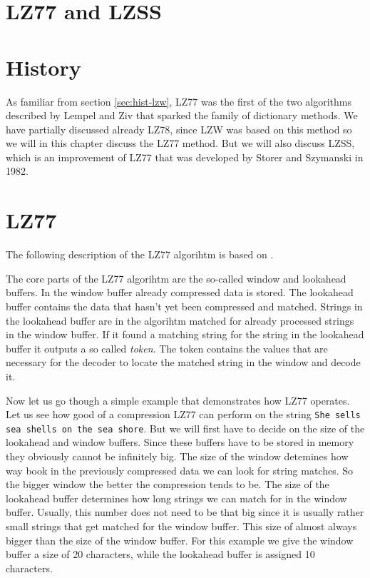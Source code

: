 \begin{comment}
  
\end{comment}

\section{LZ77 and LZSS}
\label{sec:lz77-lzss}

\section{History}

As familiar from section \ref{sec:hist-lzw}, LZ77 was the first of the
two algorithms described by Lempel and Ziv that sparked the family of
dictionary methods. We have partially discussed already LZ78, since
LZW was based on this method so we will in this chapter discuss the
LZ77 method. But we will also discuss LZSS, which is an improvement of
LZ77 that was developed by Storer and Szymanski in 1982.

\section{LZ77}

The following description of the LZ77 algorihtm is based on
\cite{Salomon:2004:DCC,mark1996data_compression_book,mcfadden92:_hackin_data_compr_ziv_lempel}.


The core parts of the LZ77 algorihtm are the so-called window and
lookahead buffers. In the window buffer already compressed data is
stored. The lookahead buffer contains the data that hasn't yet been
compressed and matched. Strings in the lookahead buffer are in the
algorihtm matched for already processed strings in the window
buffer. If it found a matching string for the string in the lookahead
buffer it outputs a so called \textit{token}. The token contains the
values that are necessary for the decoder to locate the matched
string in the window and decode it.

Now let us go though a simple example that demonstrates how LZ77
operates. Let us see how good of a compression LZ77 can perform on the
string \texttt{She sells sea shells on the sea shore}. But we will
first have to decide on the size of the lookahead and window
buffers. Since these buffers have to be stored in memory they
obviously cannot be infinitely big. The size of the window detemines
how way book in the previously compressed data we can look for string
matches. So the bigger window the better the compression tends to
be. The size of the lookahead buffer determines how long strings we
can match for in the window buffer. Usually, this number does not need
to be that big since it is usually rather small strings that get
matched for the window buffer. This size of almost always bigger than
the size of the window buffer. For this example we give the window
buffer a size of 20 characters, while the lookahead buffer is assigned
10 characters.

